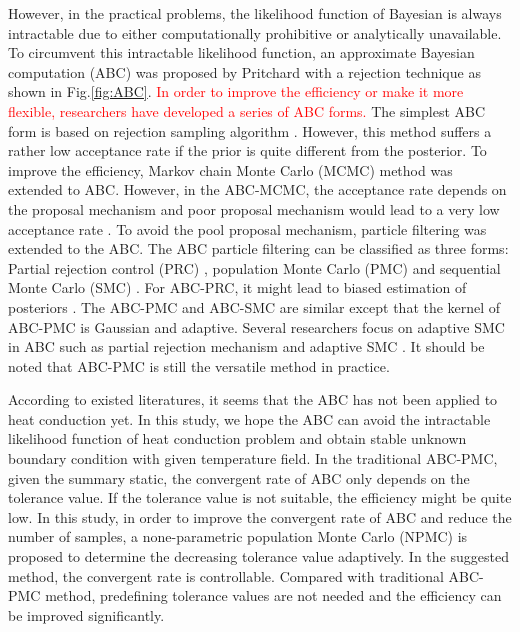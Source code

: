 \documentclass[review]{elsarticle}
\begin{document}
However, in the practical problems, the likelihood function of Bayesian is always intractable due to either computationally prohibitive or analytically unavailable. To circumvent this intractable likelihood function, an approximate Bayesian computation (ABC) was proposed by Pritchard \cite{pritchard1999population} with a rejection technique as shown in Fig.\ref{fig:ABC}. \textcolor{red}{In order to improve the efficiency or make it more flexible, researchers have developed a series of ABC forms.} The simplest ABC form is based on rejection sampling algorithm \cite{beaumont2002approximate, bortot2007inference}. However, this method suffers a rather low acceptance rate if the prior is quite different from the posterior. To improve the efficiency, Markov chain Monte Carlo (MCMC) method\cite{marjoram2003markov} was extended to ABC. However, in the ABC-MCMC, the acceptance rate depends on the proposal mechanism and poor proposal mechanism would lead to a very low acceptance rate \cite{beaumont2009adaptive}. To avoid the pool proposal mechanism, particle filtering was extended to the ABC. The ABC particle filtering can be classified as three forms: Partial rejection control (PRC) \cite{sisson2007sequential}, population Monte Carlo (PMC) \cite{beaumont2009adaptive,beaumont2010approximate} and sequential Monte Carlo (SMC) \cite{toni2009approximate}. For ABC-PRC, it might lead to biased estimation of posteriors \cite{beaumont2009adaptive}. The ABC-PMC and ABC-SMC are similar except that the kernel of ABC-PMC is Gaussian and adaptive. Several researchers focus on adaptive SMC in ABC such as partial rejection mechanism \cite{del2012adaptive} and adaptive SMC \cite{lenormand2013adaptive}. It should be noted that ABC-PMC is still the versatile method in practice.

According to existed literatures, it seems that the ABC has not been applied to heat conduction yet. In this study, we hope the ABC can avoid the intractable likelihood function of heat conduction problem and obtain stable unknown boundary condition with given temperature field. In the traditional ABC-PMC, given the summary static, the convergent rate of ABC only depends on the tolerance value. If the tolerance value is not suitable, the efficiency might be quite low. In this study, in order to improve the convergent rate of ABC and reduce the number of samples, a none-parametric population Monte Carlo (NPMC) is proposed to determine the decreasing tolerance value adaptively. In the suggested method, the convergent rate is controllable. Compared with traditional ABC-PMC method, predefining tolerance values are not needed and the efficiency can be improved significantly.
\end{document}
